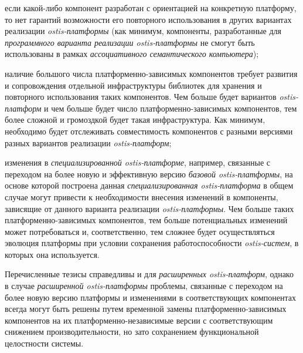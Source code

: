 \begin{SCn}
\begin{scnsubstruct}
{		\begin{scnitemize}
			\item если какой-либо компонент разработан с ориентацией на конкретную платформу, то нет гарантий возможности его повторного использования в других вариантах реализации \textit{ostis-платформы} (как минимум, компоненты, разработанные для \textit{программного варианта реализации ostis-платформы} не смогут быть использованы в рамках \textit{ассоциативного семантического компьютера});
			\item наличие большого числа платформенно-зависимых компонентов требует развития и сопровождения отдельной инфраструктуры библиотек для хранения и повторного использования таких компонентов. Чем больше будет вариантов \textit{ostis-платформ} и чем больше будет число платформенно-зависимых компонентов, тем более сложной и громоздкой будет такая инфраструктура. Как минимум, необходимо будет отслеживать совместимость компонентов с разными версиями разных вариантов реализации \textit{ostis-платформ};
			\item изменения в \textit{специализированной ostis-платформе}, например, связанные с переходом на более новую и эффективную версию \textit{базовой ostis-платформы}, на основе которой построена данная \textit{специализированная ostis-платформа} в общем случае могут привести к необходимости внесения изменений в компоненты, зависящие от данного варианта реализации \textit{ostis-платформы}. Чем больше таких платформенно-зависимых компонентов, тем больше потенциальных изменений может потребоваться и, соответственно, тем сложнее будет осуществляться эволюция платформы при условии сохранения работоспособности \textit{ostis-систем}, в которых она используется.
		\end{scnitemize} 
		
		Перечисленные тезисы справедливы и для \textit{расширенных ostis-платформ}, однако в случае \textit{расширенной ostis-платформы} проблемы, связанные с переходом на более новую версию платформы и изменениями в соответствующих компонентах всегда могут быть решены путем временной замены платформенно-зависимых компонентов на их платформенно-независимые версии с соответствующим снижением производительности, но зато сохранением функциональной целостности системы.}
	

\end{scnsubstruct}
\end{SCn}
